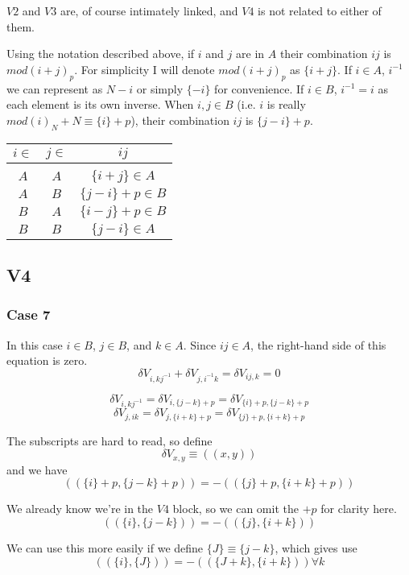 \documentclass{revtex4-1}
\begin{document}
\par $V2$ and $V3$ are, of course intimately linked, and $V4$ is not related to 
either of them.

\par Using the notation described above, if $i$ and $j$ are in $A$ their combination
$ij$ is $mod(i+j)_p$.  For simplicity I will denote $mod(i+j)_p$ as $\{i+j\}$.  If 
$i \in A$, $i^{-1}$
we can represent as $N-i$ or simply $\{-i\}$ for convenience.  If $i \in B$, $i^{-1} = i$ as
each element is its own inverse.
When $i,j \in B$ (i.e. $i$ is really $mod(i)_N +N \equiv \{i\}+p$),
their combination $ij$ is $\{j-i\}+p$.

\begin{tabular}{cc|c}
$i \in$  & $j \in$ & $ij$ \\ \hline \\
$A$ & $A$ & $\{i+j\} \in A$ \\
$A$ & $B$ & $\{j-i\} +p \in B$ \\
$B$ & $A$ & $\{i-j\} +p \in B$ \\
$B$ & $B$ & $\{j-i\} \in A$
\end{tabular}


\subsection{V4}
\subsubsection{Case 7}
In this case $i \in B$, $j \in B$, and $k \in A$.  Since $ij \in A$, the right-hand
side of this equation is zero.
$$\delta V_{i,kj^{-1}} + \delta V_{j,i^{-1}k} = \delta V_{ij,k} =0$$


$$\delta V_{i,kj^{-1}} = \delta V_{i,\{j-k\}+p} = \delta V_{\{i\}+p,\{j-k\}+p}$$
$$\delta V_{j,ik} = \delta V_{j,\{i+k\}+p} = \delta V_{\{j\}+p,\{i+k\}+p}$$

\par The subscripts are hard to read, so define 
$$\delta V_{x,y} \equiv (( x, y ))$$
and we have 
\begin{equation}
(( \{i\}+p, \{j-k\}+p )) = - (( \{j\}+p, \{i+k\}+p ))
\end{equation}
\par We already know we're in the $V4$ block, so we can omit the $+p$ for clarity here.
$$(( \{i\}, \{j-k\})) = - (( \{j\}, \{i+k\}))$$

\par We can use this more easily if we define $\{J\} \equiv \{j - k\}$, which gives use
\begin{equation}\label{eq:partialdiagonal}
(( \{i\}, \{J\})) = - (( \{J+k\}, \{i+k\})) \forall k
\end{equation}
\end{document}
